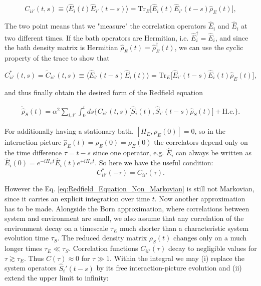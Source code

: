 \begin{equation}
	C_{ii'}(t, s) \equiv \langle \hat{E}_{i}(t) \hat{E}_{i'}(t-s) \rangle = \mathrm{Tr}_E \big[\hat{E}_{i}(t) \hat{E}_{i'}(t-s) \hat{\rho}_E(t)\big],
	\label{eq:Environment_Correlation_Function}
\end{equation}

\noindent
The two point means that we "measure" the correlation operators $\hat{E}_{i}$ and $\hat{E}_{i}$ at two different times.
If the bath operators are Hermitian, i.e. $\hat{E}_i^\dagger = \hat{E}_i$,
and since the bath density matrix is Hermitian $ \hat{\rho}_E(t) = \hat{\rho}_E^\dagger(t)$, we can use the cyclic property of the trace to show that

\begin{equation}
	C^{*}_{ii'}(t, s) = \tilde{C}_{ii'}(t, s) \equiv \langle \hat{E}_{i'}(t-s) \hat{E}_{i}(t) \rangle = \mathrm{Tr}_E \big[\hat{E}_{i'}(t-s) \hat{E}_{i}(t) \hat{\rho}_E(t)\big],
	\label{eq:Environment_Correlation_Function_Conjugate}
\end{equation}

\noindent
and thus finally obtain the desired form of the Redfield equation

\begin{align}
	\dot{\hat{\rho}}_S(t) = \alpha^2  \sum_{i, i'} \int_0^t ds
	\bigg\{
	C_{ii'}(t, s) \big[ \hat{S}_i(t),  \hat{S}_{i'}(t-s) \hat{\rho}_S(t) \big] + \text{H.c.}
	\bigg\}.
	\label{eq:Redfield_Equation_Non_Markovian}
\end{align}

\noindent
For additionally having a stationary bath, $[H_E, \rho_E(0)]=0$, so in the interaction picture $\hat{\rho}_E(t)=\hat{\rho}_E(0)=\rho_E(0)$ the correlators depend only on the time difference $\tau= t - s$ since one operator, e.g. $\hat{E}_{i}$ can always be written as $\hat{E}_{i}(0) = e^{-i H_E t} \hat{E}_i(t) e^{+i H_E t}$. So here we have the useful condition:
\begin{equation}
	C^{*}_{ii'}(-\tau) = C_{ii'}(\tau).
\end{equation}

\vspace{1em}
\noindent
However the Eq. \eqref{eq:Redfield_Equation_Non_Markovian} is still not Markovian, since it carries an explicit integration over time $t$.
Now another approximation has to be made. Alongside the Born approximation, where correlations between system and environment are small, we also assume that any correlation of the environment decay on a timescale $\tau_E$ much shorter than a characteristic system evolution time $\tau_S$. The reduced density matrix $\rho_S(t)$ changes only on a much longer times $\tau_E \ll \tau_S$. Correlation functions $C_{ii'}(\tau)$ decay to negligible values for $\tau \gtrsim \tau_E$. Thus $ C(\tau) \approx 0$ for $\tau \gg 1$. Within the integral we may (i) replace the system operators $\hat{S}_i'(t-s)$ by its free interaction-picture evolution and (ii) extend the upper limit to infinity:

